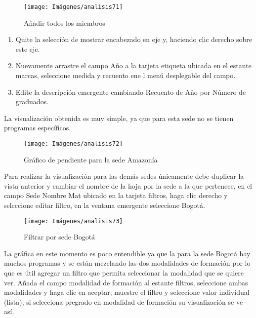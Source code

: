\documentclass[
]{book}
\begin{document}
\begin{figure}

{\centering \texttt{[image: Imágenes/analisis71]} 

}

\caption{Añadir todos los miembros}\label{fig:paso7graficopendiente-fig}
\end{figure}

\begin{enumerate}
\def\labelenumi{\arabic{enumi}.}
\setcounter{enumi}{7}
\item
  Quite la selección de mostrar encabezado en eje y, haciendo clic derecho sobre este eje.
\item
  Nuevamente arrastre el campo Año a la tarjeta etiqueta ubicada en el estante marcas, seleccione medida y recuento ene l menú desplegable del campo.
\item
  Edite la descripción emergente cambiando Recuento de Año por Número de graduados.
\end{enumerate}

La visualización obtenida es muy simple, ya que para esta sede no se tienen programas específicos.

\begin{figure}

{\centering \texttt{[image: Imágenes/analisis72]} 

}

\caption{Gráfico de pendiente para la sede Amazonía}\label{fig:graficopendienteamazonia-fig}
\end{figure}

Para realizar la visualización para las demás sedes únicamente debe duplicar la vista anterior y cambiar el nombre de la hoja por la sede a la que pertenece, en el campo Sede Nombre Mat ubicado en la tarjeta filtros, haga clic derecho y seleccione editar filtro, en la ventana emergente seleccione Bogotá.

\begin{figure}

{\centering \texttt{[image: Imágenes/analisis73]} 

}

\caption{Filtrar por sede Bogotá}\label{fig:paso1graficopendientebogota-fig}
\end{figure}

La gráfica en este momento es poco entendible ya que la para la sede Bogotá hay muchos programas y se están mezclando las dos modalidades de formación por lo que es útil agregar un filtro que permita seleccionar la modalidad que se quiere ver. Añada el campo modalidad de formación al estante filtros, seleccione ambas modalidades y haga clic en aceptar; muestre el filtro y seleccione valor individual (lista), si selecciona pregrado en modalidad de formación su visualización se ve así.
\end{document}
